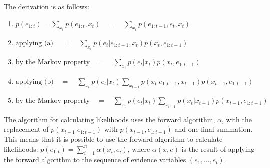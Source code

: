 \begin{center}
\end{center}

The derivation is as follows:
\begin{enumerate}

\item {$p(e_{1:t}) = \sum_{x_t}p(e_{1:t}, x_t) \quad = \quad \sum_{x_t}p({e_{1:t-1}, e_t, x_t}) $
}
\item {$\text{applying (a) } \quad= \quad
\sum_{x_t}{p(e_t | e_{1:t-1}, x_t)p(x_t, e_{1:t-1})}$
}
\item{$\text{by the Markov property} 
\quad = \quad \sum_{x_t}p(e_t | x_t)p(x_t, e_{1:t-1})$
}

\item{$\text{applying (b)} \quad =  \quad
\sum_{x_t}p(e_t | x_t) \sum_{x_{t-1}}p(x_t|e_{1:t-1}, x_{t-1}) p(x_{t-1},e_{1:t-1})$
}

\item{$\text{by the Markov property} \quad = \quad 
\sum_{x_t}{p(e_t | x_t)\sum_{x_{t-1}}p(x_t|x_{t-1}) p(x_{t-1},e_{1:t-1})}$
}

\end{enumerate}

The algorithm for calculating likelihoods uses the forward algorithm, $\alpha$, with the replacement of  $p(x_{t-1}|e_{1:t-1})$ with $p(x_{t-1}, e_{1:t-1})$ and one final summation. This means that it is possible to use the forward algorithm to calculate likelihoods: $p(e_{1:t}) = \sum_{i=1}^{n} \alpha(x_i, e_i)$, where $\alpha(x, e)$ is the result of applying the forward algorithm to the sequence of evidence variables $(e_1, ..., e_t)$.




